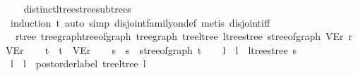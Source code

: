 \begin{isabellebody}
%
\isadelimproof
\ \ %
\endisadelimproof
%
\isatagproof
{}\isamarkupfalse%
\ distinct{\isacharunderscore}{\kern0pt}ltree{\isacharunderscore}{\kern0pt}stree{\isacharunderscore}{\kern0pt}subtrees\ \isamarkupfalse%
\ {\isacharparenleft}{\kern0pt}induction\ t{\isacharparenright}{\kern0pt}\ {\isacharparenleft}{\kern0pt}auto\ simp{\isacharcolon}{\kern0pt}\ disjoint{\isacharunderscore}{\kern0pt}family{\isacharunderscore}{\kern0pt}on{\isacharunderscore}{\kern0pt}def{\isacharcomma}{\kern0pt}\ metis\ disjoint{\isacharunderscore}{\kern0pt}iff{\isacharparenright}{\kern0pt}%
\endisatagproof
{\isafoldproof}%
%
\isadelimproof
\isanewline
%
\endisadelimproof
\isanewline
{}\isamarkupfalse%
\ {\isacharparenleft}{\kern0pt}\ rtree{\isacharparenright}{\kern0pt}\ tree{\isacharunderscore}{\kern0pt}graph{\isacharunderscore}{\kern0pt}tree{\isacharunderscore}{\kern0pt}of{\isacharunderscore}{\kern0pt}graph{\isacharcolon}{\kern0pt}\ {\isachardoublequoteopen}tree{\isacharunderscore}{\kern0pt}graph\ {\isacharparenleft}{\kern0pt}tree{\isacharunderscore}{\kern0pt}ltree\ {\isacharparenleft}{\kern0pt}ltree{\isacharunderscore}{\kern0pt}stree\ {\isacharparenleft}{\kern0pt}stree{\isacharunderscore}{\kern0pt}of{\isacharunderscore}{\kern0pt}graph\ {\isacharparenleft}{\kern0pt}V{\isacharcomma}{\kern0pt}E{\isacharcomma}{\kern0pt}r{\isacharparenright}{\kern0pt}{\isacharparenright}{\kern0pt}{\isacharparenright}{\kern0pt}{\isacharparenright}{\kern0pt}\ {\isasymsimeq}\isactrlsub r\ {\isacharparenleft}{\kern0pt}V{\isacharcomma}{\kern0pt}E{\isacharcomma}{\kern0pt}r{\isacharparenright}{\kern0pt}{\isachardoublequoteclose}\isanewline
%
\isadelimproof
%
\endisadelimproof
%
\isatagproof
{}\isamarkupfalse%
{\isacharminus}{\kern0pt}\isanewline
\ \ \isamarkupfalse%
\ t\ \ {\isachardoublequoteopen}t\ {\isacharequal}{\kern0pt}\ {\isacharparenleft}{\kern0pt}V{\isacharcomma}{\kern0pt}E{\isacharcomma}{\kern0pt}r{\isacharparenright}{\kern0pt}{\isachardoublequoteclose}\isanewline
\ \ \isamarkupfalse%
\ s\ \ {\isachardoublequoteopen}s\ {\isacharequal}{\kern0pt}\ stree{\isacharunderscore}{\kern0pt}of{\isacharunderscore}{\kern0pt}graph\ t{\isachardoublequoteclose}\isanewline
\ \ \isamarkupfalse%
\ l\ \ {\isachardoublequoteopen}l\ {\isacharequal}{\kern0pt}\ ltree{\isacharunderscore}{\kern0pt}stree\ s{\isachardoublequoteclose}\isanewline
\ \ \isamarkupfalse%
\ l{\isacharprime}{\kern0pt}\ \ {\isachardoublequoteopen}l{\isacharprime}{\kern0pt}\ {\isacharequal}{\kern0pt}\ postorder{\isacharunderscore}{\kern0pt}label\ {\isacharparenleft}{\kern0pt}tree{\isacharunderscore}{\kern0pt}ltree\ l{\isacharparenright}{\kern0pt}{\isachardoublequoteclose}\isanewline

\end{isabellebody}
